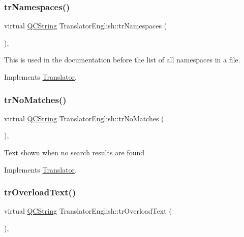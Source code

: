 \subsubsection{\texorpdfstring{trNamespaces()}{trNamespaces()}}
{\footnotesize\ttfamily virtual \mbox{\hyperlink{class_q_c_string}{Q\+C\+String}} Translator\+English\+::tr\+Namespaces (\begin{DoxyParamCaption}{ }\end{DoxyParamCaption})\hspace{0.3cm}{\ttfamily [inline]}, {\ttfamily [virtual]}}

This is used in the documentation before the list of all namespaces in a file. 

Implements \mbox{\hyperlink{class_translator}{Translator}}.

\mbox{\label{class_translator_english_adb0f12b7f60b813c8fe472960da72ce8}} 
\subsubsection{\texorpdfstring{trNoMatches()}{trNoMatches()}}
{\footnotesize\ttfamily virtual \mbox{\hyperlink{class_q_c_string}{Q\+C\+String}} Translator\+English\+::tr\+No\+Matches (\begin{DoxyParamCaption}{ }\end{DoxyParamCaption})\hspace{0.3cm}{\ttfamily [inline]}, {\ttfamily [virtual]}}

Text shown when no search results are found 

Implements \mbox{\hyperlink{class_translator}{Translator}}.

\mbox{\label{class_translator_english_a460e3fe2ccac14a7c44c098b82bad0aa}} 
\subsubsection{\texorpdfstring{trOverloadText()}{trOverloadText()}}
{\footnotesize\ttfamily virtual \mbox{\hyperlink{class_q_c_string}{Q\+C\+String}} Translator\+English\+::tr\+Overload\+Text (\begin{DoxyParamCaption}{ }\end{DoxyParamCaption})\hspace{0.3cm}{\ttfamily [inline]}, {\ttfamily [virtual]}}

